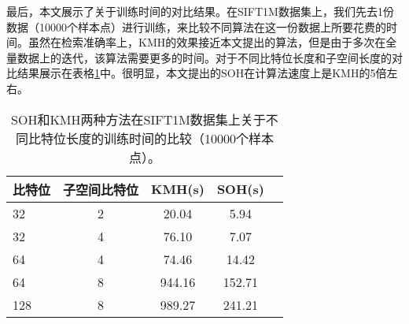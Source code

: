 最后，本文展示了关于训练时间的对比结果。在SIFT1M数据集上，我们先去1份数据（10000个样本点）进行训练，来比较不同算法在这一份数据上所要花费的时间。虽然在检索准确率上，KMH的效果接近本文提出的算法，但是由于多次在全量数据上的迭代，该算法需要更多的时间。对于不同比特位长度和子空间长度的对比结果展示在表格\ref{traintime-table}中。很明显，本文提出的SOH在计算法速度上是KMH的5倍左右。
\begin{table}[ht]
	\caption{SOH和KMH两种方法在SIFT1M数据集上关于不同比特位长度的训练时间的比较（10000个样本点）。}
	\label{traintime-table}
	\begin{center}
		\begin{small}
			\begin{sc}
				\begin{tabular}{lcccr}
					\hline
					比特位 & 子空间比特位 & KMH(s)& SOH(s) \\
					\hline
					32    & 2 & 20.04& 5.94\\
					32    & 4 & 76.10& 7.07\\
					64    & 4 & 74.46& 14.42\\
					64    & 8 & 944.16& 152.71\\
					128   & 8 & 989.27& 241.21\\
					\hline
				\end{tabular}
			\end{sc}
		\end{small}
	\end{center}
\end{table}